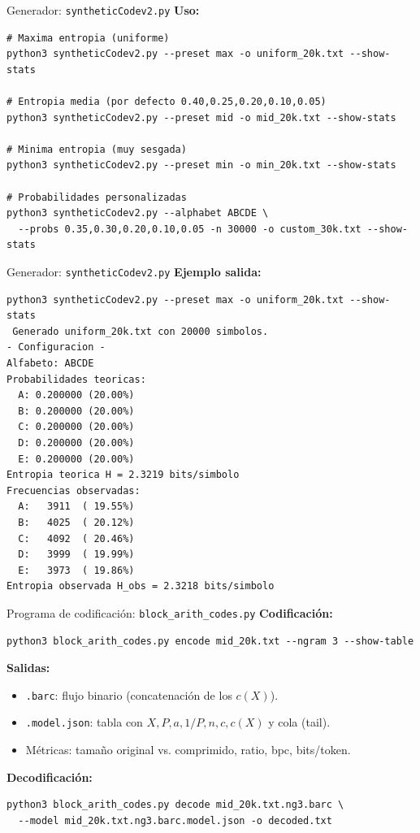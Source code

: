 \documentclass{beamer}
\theoremstyle{plain}
\theoremstyle{example}
\theoremstyle{example}
\begin{document}
\begin{frame}[fragile] {Generador: \texttt{syntheticCodev2.py}}
\textbf{Uso:}
\begin{lstlisting}
# Maxima entropia (uniforme)
python3 syntheticCodev2.py --preset max -o uniform_20k.txt --show-stats

# Entropia media (por defecto 0.40,0.25,0.20,0.10,0.05)
python3 syntheticCodev2.py --preset mid -o mid_20k.txt --show-stats

# Minima entropia (muy sesgada)
python3 syntheticCodev2.py --preset min -o min_20k.txt --show-stats

# Probabilidades personalizadas
python3 syntheticCodev2.py --alphabet ABCDE \
  --probs 0.35,0.30,0.20,0.10,0.05 -n 30000 -o custom_30k.txt --show-stats
\end{lstlisting}


\end{frame}


\begin{frame}[fragile] {Generador: \texttt{syntheticCodev2.py}}
\textbf{Ejemplo salida:}
\footnotesize
\begin{lstlisting}
python3 syntheticCodev2.py --preset max -o uniform_20k.txt --show-stats
 Generado uniform_20k.txt con 20000 simbolos.
- Configuracion -
Alfabeto: ABCDE
Probabilidades teoricas:
  A: 0.200000 (20.00%)
  B: 0.200000 (20.00%)
  C: 0.200000 (20.00%)
  D: 0.200000 (20.00%)
  E: 0.200000 (20.00%)
Entropia teorica H = 2.3219 bits/simbolo
Frecuencias observadas:
  A:   3911  ( 19.55%)
  B:   4025  ( 20.12%)
  C:   4092  ( 20.46%)
  D:   3999  ( 19.99%)
  E:   3973  ( 19.86%)
Entropia observada H_obs = 2.3218 bits/simbolo

\end{lstlisting}
\end{frame}

\begin{frame}[fragile]{Programa de codificación: \texttt{block\_arith\_codes.py}}
\textbf{Codificación:}
\begin{lstlisting}
python3 block_arith_codes.py encode mid_20k.txt --ngram 3 --show-table
\end{lstlisting}

\textbf{Salidas:}
\begin{itemize}
  \item \texttt{.barc}: flujo binario (concatenación de los \(c(X)\)).
  \item \texttt{.model.json}: tabla con \(X,P,a,1/P,n,c,c(X)\) y cola (tail).
  \item Métricas: tamaño original vs. comprimido, ratio, bpc, bits/token.
\end{itemize}

\textbf{Decodificación:}
\begin{lstlisting}
python3 block_arith_codes.py decode mid_20k.txt.ng3.barc \
  --model mid_20k.txt.ng3.barc.model.json -o decoded.txt
\end{lstlisting}
\end{frame}
\end{document}
